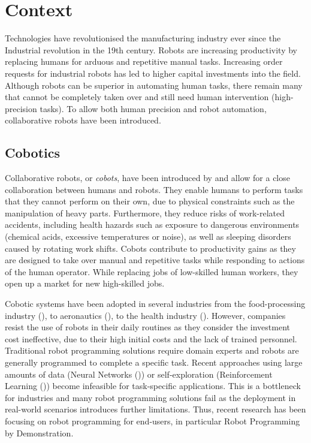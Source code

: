 \section{Context}
Technologies have revolutionised the manufacturing industry ever since the Industrial revolution in the 19th century.
Robots are increasing productivity by replacing humans for arduous and repetitive manual tasks.
Increasing order requests for industrial robots has led to higher capital investments into the field.
Although robots can be superior in automating human tasks, there remain many that cannot be completely taken over and still need human intervention (\eg high-precision tasks).
To allow both human precision and robot automation, collaborative robots have been introduced.

\subsection{Cobotics}\label{subsec:Cobotics}
Collaborative robots, or \textit{cobots}, have been introduced by \cite{colgate1999cobots} and allow for a close collaboration between humans and robots.
They enable humans to perform tasks that they cannot perform on their own, due to physical constraints such as the manipulation of heavy parts.
Furthermore, they reduce risks of work-related accidents, including health hazards such as exposure to dangerous environments (\eg chemical acids, excessive temperatures or noise), as well as sleeping disorders caused by rotating work shifts.
Cobots contribute to productivity gains as they are designed to take over manual and repetitive tasks while responding to actions of the human operator.
While replacing jobs of low-skilled human workers, they open up a market for new high-skilled jobs.

Cobotic systems have been adopted in several industries from the food-processing industry (\cite{Food}), to aeronautics (\cite{Airbus}), to the health industry (\cite{Ebola}).
However, companies resist the use of robots in their daily routines as they consider the investment cost ineffective, due to their high initial costs and the lack of trained personnel.
Traditional robot programming solutions require domain experts and robots are generally programmed to complete a specific task.
Recent approaches using large amounts of data (\eg Neural Networks (\cite{billard2001robust})) or self-exploration (\eg Reinforcement Learning (\cite{smart2002effective})) become infeasible for task-specific applications.
This is a bottleneck for industries and many robot programming solutions fail as the deployment in real-world scenarios introduces further limitations. 
Thus, recent research has been focusing on robot programming for end-users, in particular Robot Programming by Demonstration.

